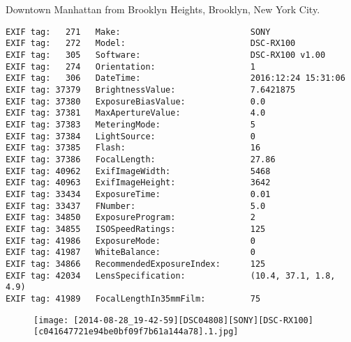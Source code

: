 \section{\protect{}}
\noindent Downtown Manhattan from Brooklyn Heights, Brooklyn, New York City.
\noindent
\begin{lstlisting}
EXIF tag:   271   Make:                          SONY
EXIF tag:   272   Model:                         DSC-RX100
EXIF tag:   305   Software:                      DSC-RX100 v1.00
EXIF tag:   274   Orientation:                   1
EXIF tag:   306   DateTime:                      2016:12:24 15:31:06
EXIF tag: 37379   BrightnessValue:               7.6421875
EXIF tag: 37380   ExposureBiasValue:             0.0
EXIF tag: 37381   MaxApertureValue:              4.0
EXIF tag: 37383   MeteringMode:                  5
EXIF tag: 37384   LightSource:                   0
EXIF tag: 37385   Flash:                         16
EXIF tag: 37386   FocalLength:                   27.86
EXIF tag: 40962   ExifImageWidth:                5468
EXIF tag: 40963   ExifImageHeight:               3642
EXIF tag: 33434   ExposureTime:                  0.01
EXIF tag: 33437   FNumber:                       5.0
EXIF tag: 34850   ExposureProgram:               2
EXIF tag: 34855   ISOSpeedRatings:               125
EXIF tag: 41986   ExposureMode:                  0
EXIF tag: 41987   WhiteBalance:                  0
EXIF tag: 34866   RecommendedExposureIndex:      125
EXIF tag: 42034   LensSpecification:             (10.4, 37.1, 1.8, 4.9)
EXIF tag: 41989   FocalLengthIn35mmFilm:         75

\end{lstlisting}
\clearpage
\begin{figure}
\raggedleft
\texttt{[image: [2014-08-28\_19-42-59][DSC04808][SONY][DSC-RX100][c041647721e94be0bf09f7b61a144a78].1.jpg]}
\end{figure}


\clearpage
